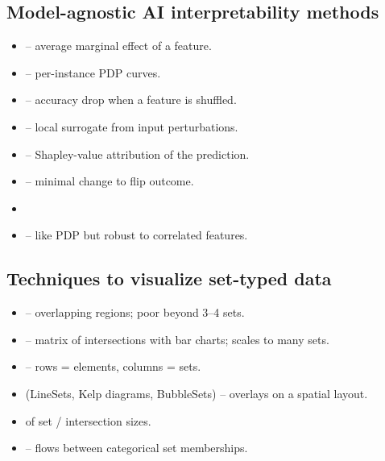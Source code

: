 \subsection{Model-agnostic AI interpretability methods}
\begin{itemize}[leftmargin=1.4em]
  \item {} -- average marginal effect of a
        feature.
  \item {} -- per-instance PDP
        curves.
  \item {} -- accuracy drop when a feature
        is shuffled.
  \item {} -- local surrogate from input perturbations.
  \item {} -- Shapley-value attribution of the prediction.
  \item {} -- minimal change to flip outcome.
  \item {}
  \item {} -- like PDP but robust to
        correlated features.
\end{itemize}

\subsection{Techniques to visualize set-typed data}
\begin{itemize}[leftmargin=1.4em]
  \item {} -- overlapping regions; poor beyond 3--4
        sets.
  \item {} -- matrix of intersections with bar charts; scales
        to many sets.
  \item {} -- rows = elements, columns = sets.
  \item {} (LineSets, Kelp diagrams, BubbleSets)
        -- overlays on a spatial layout.
  \item {} of set / intersection sizes.
  \item {} -- flows between categorical set memberships.
\end{itemize}

